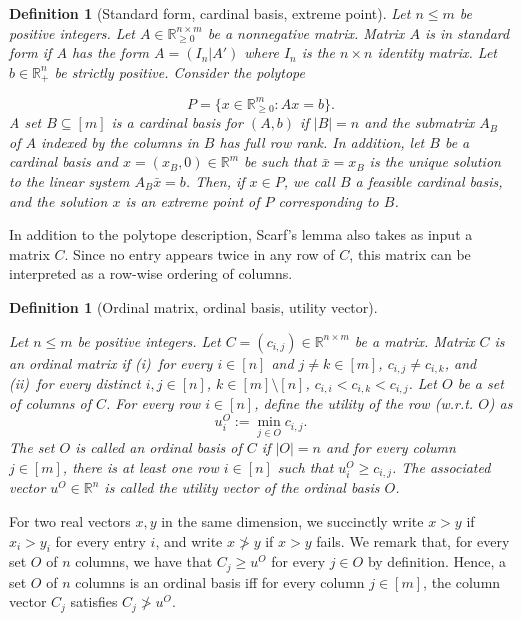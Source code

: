 \documentclass[11pt]{article}
\newcommand{\R}{\mathbb{R}}
\newtheorem{definition}[theorem]{Definition}
\begin{document}
\begin{definition}[Standard form, cardinal basis, extreme point]\label{def:dm-polytope}
    Let $n\le m$ be positive integers. Let $A\in\mathbb{R}^{n\times m}_{\ge 0}$ be a nonnegative matrix. Matrix $A$ is in \emph{standard form} if $A$ has the form $A=(I_n|A')$ where $I_n$ is the $n\times n$ identity matrix. Let $b\in\mathbb{R}^n_+$ be strictly positive. Consider the polytope

\begin{equation}\label{eq:Ax-leq-b}
P=\{x \in \mathbb{R}^{m}_{\ge 0} : Ax = b\}.
\end{equation} 
A set $B\subseteq[m]$ is a \emph{cardinal basis} for $(A,b)$ if $|B|=n$ and the submatrix $A_B$ of $A$ indexed by the columns in $B$ has full row rank. In addition, let $B$ be a cardinal basis and $x=(x_B,0)\in\mathbb{R}^m$ be such that $\bar{x}=x_B$ is the unique solution to the linear system $A_B\bar{x}=b$. Then, if $x\in P$, we call $B$ a \emph{feasible cardinal basis}, and the solution $x$ is an \emph{extreme point} of $P$ corresponding to $B$.
\end{definition}

In addition to the polytope description, Scarf's lemma also takes as input a matrix $C$. Since no entry appears twice in any row of $C$, this matrix can be interpreted as a row-wise ordering of columns.

\begin{definition}[Ordinal matrix, ordinal basis, utility vector]\label{def:ordinal-matrix}



Let $n\le m$ be positive integers. Let $C=(c_{i,j}) \in \R^{n\times m}$ be a matrix. Matrix $C$ is an \emph{ordinal matrix} if (i)~for every $i\in[n]$ and $j\neq k\in[m]$, $c_{i,j}\neq c_{i,k}$, and (ii)~for every distinct $i,j \in [n]$, $k \in [m]\setminus [n]$, $c_{i,i} < c_{i,k} < c_{i,j}$. Let $O$ be a set of columns of $C$. For every row $i \in [n]$, define the utility of the row (w.r.t. $O$) as
\begin{equation}\label{eq:Utility-Vector}
    u_i^O:=\min_{j\in O}c_{i,j}.
\end{equation}
The set $O$ is called an \emph{ordinal basis} of $C$ if $|O|=n$ and for every column $j\in[m]$, there is at least one row $i \in [n]$ such that $u^O_i\ge c_{i,j}$. The associated vector $u^O\in\mathbb{R}^n$ is called the \emph{utility vector} of the ordinal basis $O$.
\end{definition}

For two real vectors $x,y$ in the same dimension, we succinctly write $x>y$ if $x_i>y_i$ for every entry $i$, and write $x\ngtr y$ if $x>y$ fails. We remark that, for every set $O$ of $n$ columns, we have that $C_j\ge u^O$ for every $j\in O$ by definition. Hence, a set $O$ of $n$ columns is an ordinal basis iff for every column $j\in[m]$, the column vector $C_j$ satisfies $C_j\ngtr u^O$.
\end{document}

